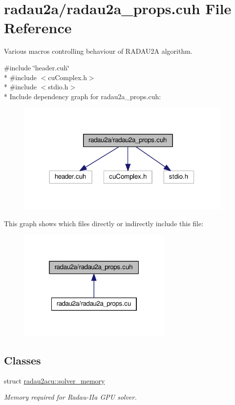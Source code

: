 \hypertarget{radau2a__props_8cuh}{}\section{radau2a/radau2a\+\_\+props.cuh File Reference}
\label{radau2a__props_8cuh}


Various macros controlling behaviour of R\+A\+D\+A\+U2A algorithm.  


{\ttfamily \#include \char`\"{}header.\+cuh\char`\"{}}\\*
{\ttfamily \#include $<$cu\+Complex.\+h$>$}\\*
{\ttfamily \#include $<$stdio.\+h$>$}\\*
Include dependency graph for radau2a\+\_\+props.\+cuh\+:\nopagebreak
\begin{figure}[H]
\begin{center}
\leavevmode
\includegraphics[width=302pt]{radau2a__props_8cuh__incl}
\end{center}
\end{figure}
This graph shows which files directly or indirectly include this file\+:\nopagebreak
\begin{figure}[H]
\begin{center}
\leavevmode
\includegraphics[width=217pt]{radau2a__props_8cuh__dep__incl}
\end{center}
\end{figure}
\subsection*{Classes}
\begin{DoxyCompactItemize}
\item 
struct \hyperlink{structradau2acu_1_1solver__memory}{radau2acu\+::solver\+\_\+memory}
\begin{DoxyCompactList}\small\item\em Memory required for Radau-\/\+I\+Ia G\+PU solver. \end{DoxyCompactList}\end{DoxyCompactItemize}
